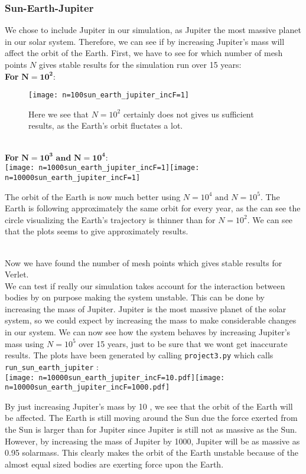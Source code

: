\documentclass[12pt]{article}
\begin{document}
	\subsubsection{Sun-Earth-Jupiter}
	We chose to include Jupiter in our simulation, as Jupiter the most massive planet in our solar system. Therefore, we can see if by increasing Jupiter's mass will affect the orbit of the Earth. First, we have to see for which number of mesh points $N$ gives stable results for the simulation run over 15 years:\\
	\textbf{For} $\mathbf{N = 10^2}$: \\
	\begin{figure}[h]
		\centering
		\texttt{[image: n=100sun\_earth\_jupiter\_incF=1]}
		\caption{Here we see that $N= 10^2$ certainly does not gives us sufficient results, as the Earth's orbit fluctates a lot. }
	\end{figure}
	\hfill \\ \pagebreak
	\textbf{For} $\mathbf{N = 10^3 \textbf{ and } N = 10^4 }$: \\
		\texttt{[image: n=1000sun\_earth\_jupiter\_incF=1]}\texttt{[image: n=10000sun\_earth\_jupiter\_incF=1]}
		\caption{The orbit of the Earth is now much better using $N = 10^4 \text{ and } N = 10^5$. The Earth is following approximately the same orbit for every year, as the can see the circle visualizing the Earth's trajectory is thinner than for $N = 10^2$. We can see that the plots seems to give approximately results. }
	\hfill\\
	Now we have found the number of mesh points which gives stable results for Verlet. \\We can test if really our simulation takes account for the interaction between bodies by on purpose making the system unstable. This can be done by increasing the mass of Jupiter. Jupiter is the most massive planet of the solar system, so we could expect by increasing the mass to make considerable changes in our system. \newpage 
	 We can now see how the system behaves by increasing Jupiter's mass using $N = 10^5$ over 15 years, just to be sure that we wont get inaccurate results. The plots have been generated by calling \texttt{project3.py} which calls \texttt{run\_sun\_earth\_jupiter} : \\ 
		\texttt{[image: n=10000sun\_earth\_jupiter\_incF=10.pdf]}\texttt{[image: n=10000sun\_earth\_jupiter\_incF=1000.pdf]}
		\caption{By just increasing Jupiter's mass by 10 , we see that the orbit of the Earth will be affected. The Earth is still moving around the Sun due the force exerted from the Sun is larger than for Jupiter since Jupiter is still not as massive as the Sun. \\
			However, by increasing the mass of Jupiter by 1000, Jupiter will be as massive as 0.95 solarmass.  This clearly makes the orbit of the Earth unstable because of the almost equal sized bodies are exerting force upon the Earth.  }
\end{document}
